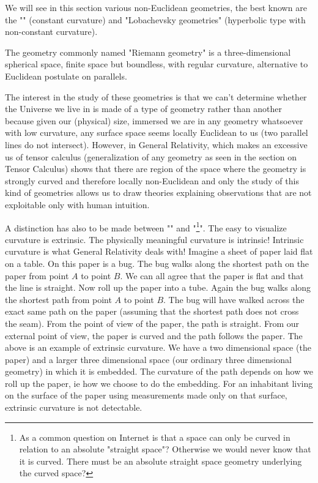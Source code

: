 	We will see in this section various non-Euclidean geometries, the best known are the "" (constant curvature) and "Lobachevsky geometries" (hyperbolic type with non-constant curvature).
	
	\begin{tcolorbox}[title=Remark,colframe=black,arc=10pt]
	The geometry commonly named "Riemann geometry" is a three-dimensional spherical space, finite space but boundless, with regular curvature, alternative to  Euclidean postulate on parallels.
	\end{tcolorbox}
	
	The interest in the study of these geometries is that we can't determine whether the Universe we live in is made of a type of geometry rather than another because given our (physical) size, immersed we are in any geometry whatsoever with low curvature, any surface space seems locally Euclidean to us (two parallel lines do not intersect). However, in General Relativity, which makes an excessive us of tensor calculus (generalization of any geometry as seen in the section on Tensor Calculus) shows that there are region of the space where the geometry is strongly curved and therefore locally non-Euclidean and only the study of this kind of geometries allows us to draw theories explaining observations that are not exploitable only with human intuition.
	
	A distinction has also to be made between "" and "\footnote{As a common question on Internet is that a space can only be curved in relation to an absolute "straight space"? Otherwise we would never know that it is curved. There must be an absolute straight space geometry underlying the curved space?}". The easy to visualize curvature is extrinsic. The physically meaningful curvature is intrinsic! Intrinsic curvature is what General Relativity deals with! Imagine a sheet of paper laid flat on a table. On this paper is a bug. The bug walks along the shortest path on the paper from point $A$ to point $B$. We can all agree that the paper is flat and that the line is straight. Now roll up the paper into a tube. Again the bug walks along the shortest path from point $A$ to point $B$. The bug will have walked across the exact same path on the paper (assuming that the shortest path does not cross the seam). From the point of view of the paper, the path is straight. From our external point of view, the paper is curved and the path follows the paper. The above is an example of extrinsic curvature. We have a two dimensional space (the paper) and a larger three dimensional space (our ordinary three dimensional geometry) in which it is embedded. The curvature of the path depends on how we roll up the paper, ie how we choose to do the embedding. For an inhabitant living on the surface of the paper using measurements made only on that surface, extrinsic curvature is not detectable.
	
